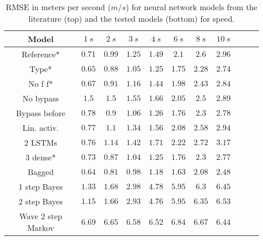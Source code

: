\documentclass[preprint,12pt]{elsarticle}
\begin{document}
\begin{table}[!ht]
	\centering
    \begin{tabular}{|c|c|c|c|c|c|c|c|c|c|c|}
        \hline
        Model & $1 \ s$ & $2 \ s$ & $3 \ s$ & $4 \ s$ & $6 \ s$ & $8 \ s$ & $10 \ s$ \\ \hline
        Reference* & $0.71$ & $0.99$ & $1.25$ & $1.49$ & $2.1$ & $2.6$ & $2.96$ \\ \hline
        Type* & $0.65$ & $0.88$ & $1.05$ & $1.25$ & $1.75$ & $2.28$ & $2.74$ \\ \hline
        No f f* & $0.67$ & $0.91$ & $1.16$ & $1.44$ & $1.98$ & $2.43$ & $2.84$ \\ \hline
        No bypass & $1.5$ & $1.5$ & $1.55$ & $1.66$ & $2.05$ & $2.5$ & $2.89$ \\ \hline
        Bypass before & $0.78$ & $0.9$ & $1.06$ & $1.26$ & $1.76$ & $2.3$ & $2.78$ \\ \hline
        Lin. activ. & $0.77$ & $1.1$ & $1.34$ & $1.56$ & $2.08$ & $2.58$ & $2.94$ \\ \hline
        2 LSTMs & $0.76$ & $1.14$ & $1.42$ & $1.71$ & $2.22$ & $2.72$ & $3.17$ \\ \hline
        3 dense* & $0.73$ & $0.87$ & $1.04$ & $1.25$ & $1.76$ & $2.3$ & $2.77$ \\ \hline
        Bagged & $\mathbf{0.64}$ & $\mathbf{0.81}$ & $\mathbf{0.98}$ & $\mathbf{1.18}$ & $\mathbf{1.63}$ & $\mathbf{2.08}$ & $\mathbf{2.48}$ \\ \hline 
        1 step Bayes & $1.33$ & $1.68$ & $2.98$ & $4.78$ & $5.95$ & $6.3$ & $6.45$ \\ \hline
        2 step Bayes & $1.15$ & $1.66$ & $2.93$ & $4.76$ & $5.95$ & $6.35$ & $6.53$ \\ \hline
        Wave 2 step Markov & $6.69$ & $6.65$ & $6.58$ & $6.52$ & $6.84$ & $6.67$ & $6.44$ \\ \hline
    \end{tabular}
    \caption{RMSE in meters per second ($m/s$) for neural network models from the literature \cite{altche2017lstm} (top) and the tested models (bottom) for speed.}
    \label{tab:longitudinal_speed}
\end{table}
\end{document}
